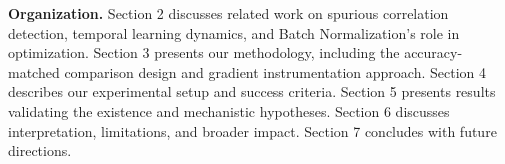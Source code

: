 \textbf{Organization.} Section 2 discusses related work on spurious correlation detection, temporal learning dynamics, and Batch Normalization's role in optimization. Section 3 presents our methodology, including the accuracy-matched comparison design and gradient instrumentation approach. Section 4 describes our experimental setup and success criteria. Section 5 presents results validating the existence and mechanistic hypotheses. Section 6 discusses interpretation, limitations, and broader impact. Section 7 concludes with future directions.
